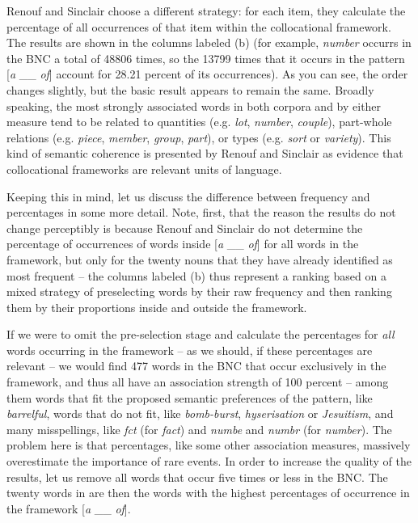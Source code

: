 Renouf and Sinclair choose a different strategy: for each item, they calculate the percentage of all occurrences of that item within the collocational  framework.  The results are shown in the columns labeled (b) (for example, \textit{number} occurrs in the BNC  a total of \num{48806} times, so the \num{13799} times that it occurs in the pattern [\textit{a} \_\_ \textit{of}] account for \num{28.21} percent of its occurrences). As you can see, the order changes slightly, but the basic result appears to remain the same. Broadly speaking, the most strongly associated  words in both corpora and by either measure tend to be related to quantities (e.g. \textit{lot}, \textit{number}, \textit{couple}), part\hyp{}whole relations (e.g. \textit{piece}, \textit{member}, \textit{group}, \textit{part}), or types (e.g. \textit{sort} or \textit{variety}).  This kind of semantic  coherence is presented by Renouf and Sinclair as evidence that collocational  frameworks  are relevant units of language.

Keeping this in mind, let us discuss the difference between frequency  and percentages in some more detail. Note, first, that the reason the results do not change perceptibly is because Renouf and Sinclair do not determine the percentage of occurrences of words inside [\textit{a} \_\_ \textit{of}] for all words in the framework,  but only for the twenty nouns  that they have already identified as most frequent -- the columns labeled (b) thus represent a ranking based on a mixed strategy of preselecting words by their raw frequency  and then ranking them by their proportions inside and outside the  framework.

If we were to omit the pre\hyp{}selection stage and calculate the percentages for \emph{all} words occurring in the framework  -- as we should, if these percentages are relevant -- we would find 477 words in the BNC  that occur exclusively in the framework, and thus all have an association  strength of 100 percent -- among them words that fit the proposed semantic  preferences of the pattern, like \textit{barrelful}, words that do not fit, like \textit{bomb\hyp{}burst}, \textit{hyserisation} or \textit{Jesuitism}, and many misspellings, like \textit{fct} (for \textit{fact}) and \textit{numbe} and \textit{numbr} (for \textit{number}). The problem here is that percentages, like some other association  measures,  massively overestimate the importance of rare events. In order to increase the quality of the results, let us remove all words that occur five times or less in the BNC.  The twenty words in  are then the words with the highest percentages of occurrence in the framework  [\textit{a} \_\_ \textit{of}].

